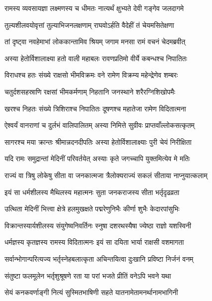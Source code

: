 \twolineshloka
{रामस्य व्यवसायज्ञा लक्ष्मणस्य च धीमतः}
{नात्यर्थं क्षुभ्यते देवी गङ्गेव जलदागमे} %

\twolineshloka
{तुल्यशीलवयोवृत्तां तुल्याभिजनलक्षणाम्}
{राघवोऽर्हति वैदेहीं तं चेयमसितेक्षणा} %

\twolineshloka
{तां दृष्ट्वा नवहेमाभां लोककान्तामिव श्रियम्}
{जगाम मनसा रामं वचनं चेदमब्रवीत्} %

\twolineshloka
{अस्या हेतोर्विशालाक्ष्या हतो वाली महाबलः}
{रावणप्रतिमो वीर्ये कबन्धश्च निपातितः} %

\twolineshloka
{विराधश्च हतः संख्ये राक्षसो भीमविक्रमः}
{वने रामेण विक्रम्य महेन्द्रेणेव शम्बरः} %

\twolineshloka
{चतुर्दशसहस्राणि रक्षसां भीमकर्मणाम्}
{निहतानि जनस्थाने शरैरग्निशिखोपमैः} %

\twolineshloka
{खरश्च निहतः संख्ये त्रिशिराश्च निपातितः}
{दूषणश्च महातेजा रामेण विदितात्मना} %

\twolineshloka
{ऐश्वर्यं वानराणां च दुर्लभं वालिपालितम्}
{अस्या निमित्ते सुग्रीवः प्राप्तवाँल्लोकसत्कृतम्} %

\twolineshloka
{सागरश्च मया क्रान्तः श्रीमान्नदनदीपतिः}
{अस्या हेतोर्विशालाक्ष्याः पुरी चेयं निरीक्षिता} %

\twolineshloka
{यदि रामः समुद्रान्तां मेदिनीं परिवर्तयेत्}
{अस्याः कृते जगच्चापि युक्तमित्येव मे मतिः} %

\twolineshloka
{राज्यं वा त्रिषु लोकेषु सीता वा जनकात्मजा}
{त्रैलोक्यराज्यं सकलं सीताया नाप्नुयात्कलाम्} %

\twolineshloka
{इयं सा धर्मशीलस्य मैथिलस्य महात्मनः}
{सुता जनकराजस्य सीता भर्तृदृढव्रता} %

\twolineshloka
{उत्थिता मेदिनीं भित्त्वा क्षेत्रे हलमुखक्षते}
{पद्मरेणुनिभैः कीर्णा शुभैः केदारपांसुभिः} %

\twolineshloka
{विक्रान्तस्यार्यशीलस्य संयुगेष्वनिवर्तिनः}
{स्नुषा दशरथस्यैषा ज्येष्ठा राज्ञो यशस्विनी} %

\twolineshloka
{धर्मज्ञस्य कृतज्ञस्य रामस्य विदितात्मनः}
{इयं सा दयिता भार्या राक्षसी वशमागता} %

\twolineshloka
{सर्वान्भोगान्परित्यज्य भर्तृस्नेहबलात्कृता}
{अचिन्तयित्वा दुःखानि प्रविष्टा निर्जनं वनम्} %

\twolineshloka
{संतुष्टा फलमूलेन भर्तृशुश्रूषणे रता}
{या परां भजते प्रीतिं वनेऽपि भवने यथा} %

\twolineshloka
{सेयं कनकवर्णाङ्गी नित्यं सुस्मितभाषिणी}
{सहते यातनामेतामनर्थानामभागिनी} %

